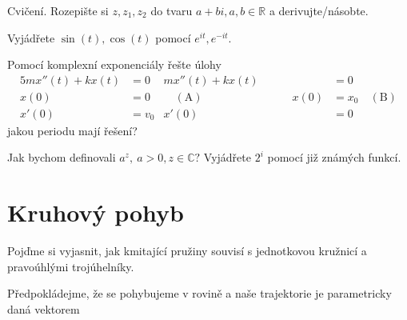\begin{důkaz}
  Cvičení. Rozepište si $z, z_1, z_2$ do tvaru $a+bi, a,b\in \mathbb{R}$ a derivujte/násobte.
\end{důkaz}
\begin{úloha}
  Vyjádřete $\sin(t), \cos(t)$ pomocí $e^{it},e^{-it}.$
\end{úloha}
\begin{úloha}
  Pomocí komplexní exponenciály řešte úlohy
  \begin{alignat*}{5}
	  mx''(t)+kx(t) &= 0 & mx''(t)+kx(t) &= 0 \\
	  x(0) &= 0 & \quad (\text{A}) \hspace{8em}       x(0) &= x_0 \quad (\text{B}) \\
	  	x'(0) &= v_0 & 		           x'(0) &= 0
  \end{alignat*}
  jakou periodu mají řešení?
\end{úloha}
\begin{úloha}
  Jak bychom definovali $a^{z},\ a>0, z\in \mathbb{C}?$ Vyjádřete $2^{i}$ pomocí již známých funkcí.
\end{úloha}
\section{Kruhový pohyb}
Pojďme si vyjasnit, jak kmitající pružiny souvisí s jednotkovou kružnicí a pravoúhlými trojúhelníky.

Předpokládejme, že se pohybujeme v rovině a naše trajektorie je parametricky daná vektorem

